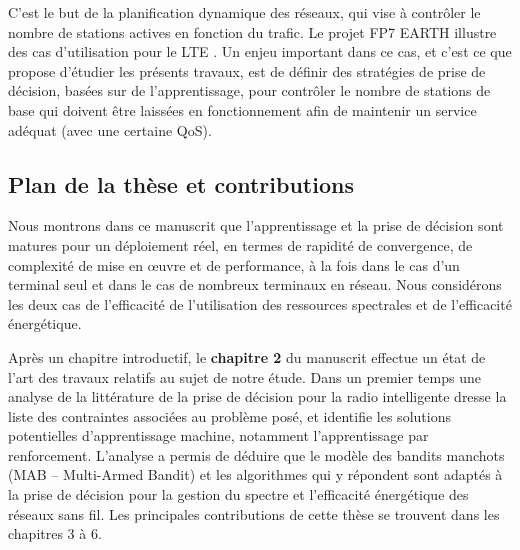 
C’est le but de la planification dynamique des réseaux, qui vise à contrôler le nombre de stations actives en fonction du trafic. Le projet FP7 EARTH illustre des cas d’utilisation pour le LTE \cite{FP7EARTH}. Un enjeu important dans ce cas, et c’est ce que propose d’étudier les présents travaux, est de définir des stratégies de prise de décision, basées sur de l’apprentissage, pour contrôler le nombre de stations de base qui doivent être laissées en fonctionnement afin de maintenir un service adéquat (avec une certaine QoS).

\subsection*{Plan de la thèse et contributions}

Nous montrons dans ce manuscrit que l’apprentissage et la prise de décision sont matures pour un déploiement réel, en termes de rapidité de convergence, de complexité de mise en œuvre et de performance, à la fois dans le cas d’un terminal seul et dans le cas de nombreux terminaux en réseau. Nous considérons les deux cas de l’efficacité de l’utilisation des ressources spectrales et de l’efficacité énergétique.

Après un chapitre introductif, le \textbf{chapitre 2} du manuscrit effectue un état de l’art des travaux relatifs au sujet de notre étude. Dans un premier temps une analyse de la littérature de la prise de décision pour la radio intelligente dresse la liste des contraintes associées au problème posé, et identifie les solutions potentielles d’apprentissage machine, notamment l’apprentissage par renforcement. L’analyse a permis de déduire que le modèle des bandits manchots (MAB – Multi-Armed Bandit) et les algorithmes qui y répondent sont adaptés à la prise de décision pour la gestion du spectre et l’efficacité énergétique des réseaux sans fil.
Les principales contributions de cette thèse se trouvent dans les chapitres 3 à 6. 

